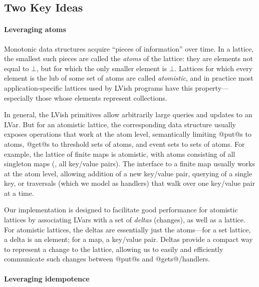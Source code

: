 \subsection{Two Key Ideas}\label{subsection:atomic}


\paragraph{Leveraging atoms}

Monotonic data structures acquire ``pieces of
information'' over time.  In a lattice, the smallest such pieces are called the
\emph{atoms} of the lattice: they are elements not equal to $\bot$, but for
which the only smaller element is $\bot$.  Lattices for which every element is
the lub of some set of atoms are called \emph{atomistic}, and in practice most
application-specific lattices used by LVish programs 
have this property---especially those whose elements represent
collections.

In general, the LVish primitives allow arbitrarily large queries and updates
to an LVar.  But for an atomistic lattice, the corresponding data structure
usually exposes operations that work at the atom level, semantically limiting
@put@s to atoms, @get@s to threshold sets of atoms, and event sets to sets of
atoms.  For example, the lattice of finite maps is atomistic, with atoms
consisting of all singleton maps (\ie, all key/value pairs).  The interface to a
finite map usually works at the atom level, allowing addition of a new
key/value pair, querying of a single key, or traversals (which we model as
handlers) that walk over one key/value pair at a time.

Our implementation is designed to facilitate good performance for atomistic
lattices by associating LVars with a set of \emph{deltas} (changes), as well as
a lattice.  For atomistic lattices, the deltas are essentially just the
atoms---for a set lattice, a delta is an element; for a map, a key/value pair.
Deltas provide a compact way to represent a change to the lattice, allowing us
to easily and efficiently communicate such changes between @put@s and
@gets@/handlers.

\paragraph{Leveraging idempotence}

